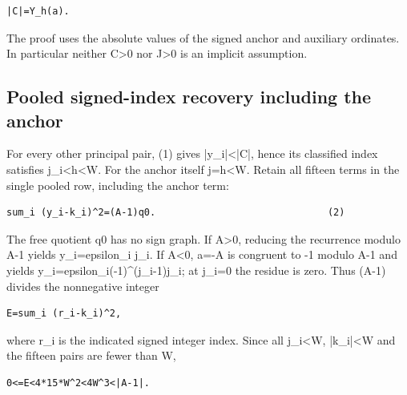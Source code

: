 \begin{verbatim}
|C|=Y_h(a).
\end{verbatim}

The proof uses the absolute values of the signed anchor and auxiliary ordinates. In particular neither C\textgreater{}\allowbreak{}0 nor J\textgreater{}\allowbreak{}0 is an implicit assumption.



\subsection{Pooled signed-index recovery including the anchor}



For every other principal pair, (1) gives |y\_\allowbreak{}i|\textless{}\allowbreak{}|C|, hence its classified index satisfies j\_\allowbreak{}i\textless{}\allowbreak{}h\textless{}\allowbreak{}W. For the anchor itself j=\allowbreak{}h\textless{}\allowbreak{}W. Retain all fifteen terms in the single pooled row, including the anchor term:



\begin{verbatim}
sum_i (y_i-k_i)^2=(A-1)q0.                              (2)
\end{verbatim}

The free quotient q0 has no sign graph. If A\textgreater{}\allowbreak{}0, reducing the recurrence modulo A-1 yields y\_\allowbreak{}i=\allowbreak{}epsilon\_\allowbreak{}i j\_\allowbreak{}i. If A\textless{}\allowbreak{}0, a=\allowbreak{}-A is congruent to -1 modulo A-1 and yields y\_\allowbreak{}i=\allowbreak{}epsilon\_\allowbreak{}i(-1)\textasciicircum{}\allowbreak{}(j\_\allowbreak{}i-1)j\_\allowbreak{}i; at j\_\allowbreak{}i=\allowbreak{}0 the residue is zero. Thus (A-1) divides the nonnegative integer



\begin{verbatim}
E=sum_i (r_i-k_i)^2,
\end{verbatim}

where r\_\allowbreak{}i is the indicated signed integer index. Since all j\_\allowbreak{}i\textless{}\allowbreak{}W, |k\_\allowbreak{}i|\textless{}\allowbreak{}W and the fifteen pairs are fewer than W,



\begin{verbatim}
0<=E<4*15*W^2<4W^3<|A-1|.
\end{verbatim}

